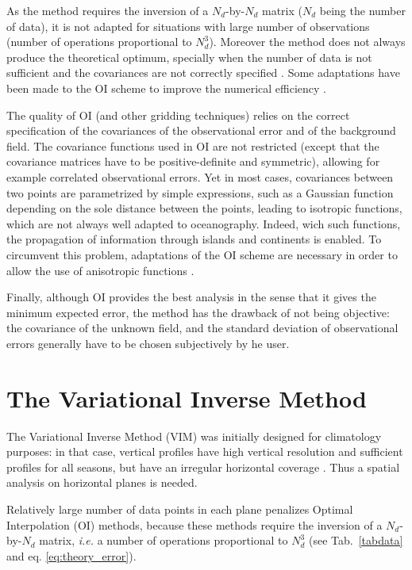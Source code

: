 As the method requires the inversion of a $N_{d}$-by-$N_{d}$ matrix ($N_{d}$ being the number of data), it is not adapted for situations with large number of observations (number of operations proportional to $N_{d}^{3}$). Moreover the method does not always produce the theoretical optimum, specially when the number of data is not sufficient and the covariances are not correctly specified \citep[e.g.,][]{RIXEN00,GOMIS01}. Some adaptations have been made to the OI scheme to improve the numerical efficiency \citep[e.g.,][]{HARTMAN08,ZHANG10}.

The quality of OI (and other gridding techniques) relies on the correct specification of the covariances of the observational error and of the background field. The covariance functions used in OI are not restricted (except that the covariance matrices have to be positive-definite and symmetric), allowing for example correlated observational errors. Yet in most cases, covariances between two points are parametrized by simple expressions, such as a Gaussian function depending on the sole distance between the points, leading to isotropic functions, which are not always well adapted to oceanography. Indeed, wich such functions, the propagation of information through islands and continents is enabled. To circumvent this problem, adaptations of the OI scheme are necessary in order to allow the use of anisotropic functions \citep[e.g.,][]{TANDEO11}.

Finally, although OI provides the best analysis in the sense that it gives the minimum expected error, the method has the drawback of not being objective: the covariance of the unknown field, and the standard deviation of observational errors generally have to be chosen subjectively by he user.

\section[VIM and its implementation]{The Variational Inverse Method}

The Variational Inverse Method (VIM) was initially designed for climatology purposes: in that case, vertical profiles have high vertical resolution and sufficient profiles for all seasons, but have an irregular horizontal coverage \citep{BRASSEUR96}. Thus a spatial analysis on horizontal planes is needed. 

Relatively large number of data points in each plane penalizes Optimal Interpolation (OI) methods, because these methods require the inversion of a $N_{d}$-by-$N_{d}$ matrix, \textit{i.e.} a number of operations proportional to $N_{d}^{3}$ (see Tab.~\ref{tabdata} and eq. \ref{eq:theory_error}).

